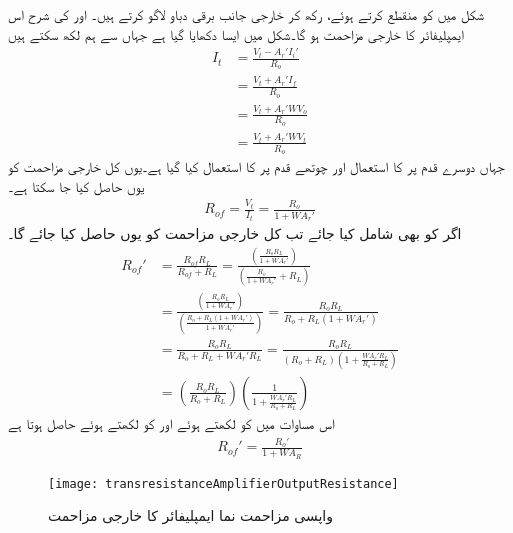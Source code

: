 شکل  میں  کو منقطع کرتے ہوئے،  رکھ  کر خارجی جانب برقی دباو  لاگو کرتے ہیں۔ اور  کی شرح اس ایمپلیفائر کا خارجی مزاحمت  ہو گا۔شکل  میں ایسا دکھایا گیا ہے جہاں سے ہم لکھ سکتے ہیں
\begin{align*}
I_t &=\frac{V_t-A_r' I_i'}{R_o} \\
&=\frac{V_t+A_r' I_f}{R_o} \\
&=\frac{V_t+A_r' W V_o}{R_o} \\
&=\frac{V_t+A_r' W V_t}{R_o}
\end{align*}
جہاں دوسرے قدم پر  کا استعمال اور چوتھے قدم پر  کا استعمال کیا گیا ہے۔یوں کل خارجی مزاحمت  کو یوں حاصل کیا جا سکتا ہے۔
\begin{align}
R_{of}=\frac{V_t}{I_t}=\frac{R_o}{1+W A_r'}
\end{align}
اگر  کو بھی شامل کیا جائے تب کل خارجی مزاحمت  کو یوں حاصل کیا جائے گا۔
\begin{align*}
R_{of}' &=\frac{R_{of} R_L}{R_{of}+R_L}=\frac{\left(\frac{R_o R_L}{1+W A_r'} \right)}{\left(\frac{R_o}{1+W A_r'}+R_L \right)}\\
&=\frac{\left(\frac{R_o R_L}{1+W A_r'} \right)}{\left(\frac{R_o+R_L \left(1+W A_r' \right )}{1+W A_r'} \right)}=\frac{R_o R_L}{R_o+R_L \left (1+W A_r'  \right)} \\
&=\frac{R_o R_L}{R_o+R_L +W A_r' R_L}=\frac{R_o R_L}{\left(R_o+R_L \right ) \left(1+ \frac{W A_r' R_L}{R_o+R_L}\right)}\\
&=\left(\frac{R_o R_L}{R_o+R_L} \right) \left (\frac{1}{1+\frac{W A_r' R_L}{R_o+R_L}} \right)
\end{align*}
اس مساوات میں  کو  لکھتے ہوئے اور  کو  لکھتے ہوئے حاصل ہوتا ہے
\begin{align}
R_{of}'=\frac{R_o'}{1+W A_R}
\end{align}
%
\begin{figure}
\centering
\texttt{[image: transresistanceAmplifierOutputResistance]}
\caption{واپسی مزاحمت نما ایمپلیفائر کا خارجی مزاحمت}
\label{شکل_واپسی_مزاحمت_نما_ایمپلیفائر_خارجی_مزاحمت}
\end{figure}

